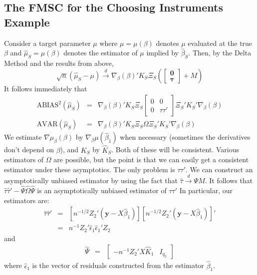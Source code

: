\documentclass[12pt]{article}
\theoremstyle{definition}
\begin{document}
\subsection{The FMSC for the Choosing Instruments Example}
Consider a target parameter $\mu$ where $\mu = \mu(\beta)$ denotes $\mu$ evaluated at the true $\beta$ and $\widehat{\mu}_S = \mu(\beta)$ denotes the estimator of $\mu$ implied by $\widehat{\beta}_S$. Then, by the Delta Method and the results from above,
  $$\sqrt{n}\left( \widehat{\mu}_S - \mu \right) \overset{d}{\rightarrow} \nabla_\beta (\beta)' K_S \Xi_S\left(\left[\begin{array}
           {c} \mathbf{0} \\ \boldsymbol{\tau}
         \end{array}\right] + M \right)$$
It follows immediately that 
  \begin{eqnarray*}
    \mbox{ABIAS}^2(\widehat{\mu}_S) &=&  \nabla_\beta (\beta)' K_S \Xi_S  \left[\begin{array}
      {cc}
      0 & 0 \\ 0 & \tau \tau'
    \end{array} \right]  \Xi_S' K_S' \nabla_\beta (\beta)  \\
    \mbox{AVAR}(\widehat{\mu}_S) &=& \nabla_\beta (\beta)' K_S \Xi_S  \Omega  \Xi_S' K_S' \nabla_\beta (\beta)
  \end{eqnarray*}
We estimate $\nabla\mu_\beta(\beta)$ by $\nabla_\beta\mu(\widehat{\beta}_1)$ when necessary (sometimes the derivatives don't depend on $\beta$), and $K_S$ by $\widehat{K}_S$. Both of these will be consistent. Various estimators of $\Omega$ are possible, but the point is that we can easily get a consistent estimator under these asymptotics. The only problem is $\tau \tau'$. We can construct an asymptotically unbiased estimator by using the fact that $\widehat{\tau} \overset{d}{\rightarrow} \Psi M$. It follows that $\widehat{\tau}\widehat{\tau}' - \widehat{\Psi} \widehat{\Omega} \widehat{\Psi}$ is an asymptotically unbiased estimator of $\tau\tau'$ In particular, our estimators are:
\begin{eqnarray*}
  \widehat{\tau} \widehat{\tau}' &=& \left[n^{-1/2} Z_2'\left(\textbf{y} - X\widehat{\beta}_1\right)\right] \left[n^{-1/2} Z_2'\left(\textbf{y} - X\widehat{\beta}_1\right) \right]'\\
    &=&n^{-1} Z_2' \hat{\epsilon}_1 \hat{\epsilon}_1' Z_2 
\end{eqnarray*}
and
\begin{eqnarray*}
  \widehat{\Psi} &=& \left[ \begin{array}{cc}
      -n^{-1} Z_2'X \widehat{K}_1 & I_{q_2}
  \end{array}\right]
\end{eqnarray*}
where $\hat{\epsilon}_1$ is the vector of residuals constructed from the estimator $\widehat{\beta}_1$.
\end{document}
